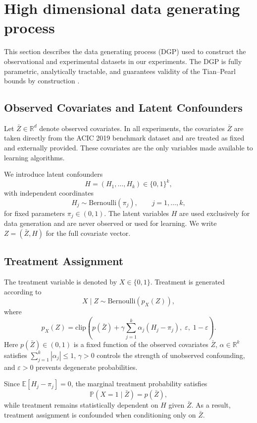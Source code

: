 \documentclass[accepted]{uai2026} %
\theoremstyle{plain}
\theoremstyle{definition}
\theoremstyle{remark}
\begin{document}
\section{High dimensional data generating process}
\label{app:dgp-high-dim}

This section describes the data generating process (DGP) used to construct
the observational and experimental datasets in our experiments.
The DGP is fully parametric, analytically tractable, and guarantees
validity of the Tian--Pearl bounds by construction \citep{tian2000probabilities}.

\subsection{Observed Covariates and Latent Confounders}

Let $\bar{Z} \in \mathbb{R}^d$ denote observed covariates.
In all experiments, the covariates $\bar{Z}$ are taken directly from the
ACIC 2019 benchmark dataset and are treated as fixed and externally provided.
These covariates are the only variables made available to learning algorithms.

We introduce latent confounders
\[
H = (H_1,\dots,H_k) \in \{0,1\}^k,
\]
with independent coordinates
\[
H_j \sim \mathrm{Bernoulli}(\pi_j), \qquad j=1,\dots,k,
\]
for fixed parameters $\pi_j \in (0,1)$.
The latent variables $H$ are used exclusively for data generation and are
never observed or used for learning.
We write $Z = (\bar{Z},H)$ for the full covariate vector.

\subsection{Treatment Assignment}

The treatment variable is denoted by $X \in \{0,1\}$.
Treatment is generated according to
\[
X \mid Z \sim \mathrm{Bernoulli}\!\left(p_X(Z)\right),
\]
where
\begin{equation}
\label{eq:treatment-model}
p_X(Z)
=
\mathrm{clip}\!\left(
p(\bar{Z}) + \gamma \sum_{j=1}^k \alpha_j (H_j - \pi_j),
\;\varepsilon,\;1-\varepsilon
\right).
\end{equation}
Here $p(\bar{Z}) \in (0,1)$ is a fixed function of the observed covariates
$\bar{Z}$,
$\alpha \in \mathbb{R}^k$ satisfies $\sum_{j=1}^k |\alpha_j| \le 1$,
$\gamma > 0$ controls the strength of unobserved confounding,
and $\varepsilon > 0$ prevents degenerate probabilities.

Since $\mathbb{E}[H_j - \pi_j]=0$, the marginal treatment probability satisfies
\[
\mathbb{P}(X=1 \mid \bar{Z}) = p(\bar{Z}),
\]
while treatment remains statistically dependent on $H$ given $\bar{Z}$.
As a result, treatment assignment is confounded when conditioning only on
$\bar{Z}$.
\end{document}
